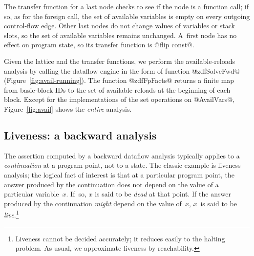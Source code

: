\documentclass[blockstyle,preprint,nocopyrightspace]{sigplanconf}
\newcommand\figref[1]{Figure~\ref{fig:#1}}
\begin{document}
The transfer function for a last node checks to see if the node is a
function call; if so, as for the foreign call, the set of
available variables is empty on every outgoing control-flow edge.
Other last nodes do not change values of variables or stack slots, 
so the set of available variables remains unchanged.
%
A~first node has no effect on program state, so its transfer function
is @flip const@.


Given the lattice and the transfer functions,
we perform the available-reloads analysis by calling
the dataflow engine in the form of function @zdfSolveFwd@
(\figref{avail-running}).
The function @zdfFpFacts@ returns 
a finite map from basic-block IDs to the set of available reloads
at the beginning of each block.
Except for the implementations of the set operations on @AvailVars@,
\figref{avail} shows the \emph{entire} analysis.


\subsection{Liveness: a backward analysis} 

The assertion computed by 
a backward dataflow analysis typically applies to a
\emph{continuation} at a program point, not to a state.
The classic example is liveness analysis;
the logical fact of interest is that at a particular program point,
the answer produced by the continuation does not depend on
the value of a particular variable~$x$.
If~so, $x$ is said to be \emph{dead} at that point.
If the answer produced by the continuation \emph{might} depend on the
value of~$x$, $x$~is said to be \emph{live}.\footnote
{Liveness cannot be decided accurately; it reduces easily to the halting problem.
As usual, we approximate liveness by reachability.}
\end{document}
